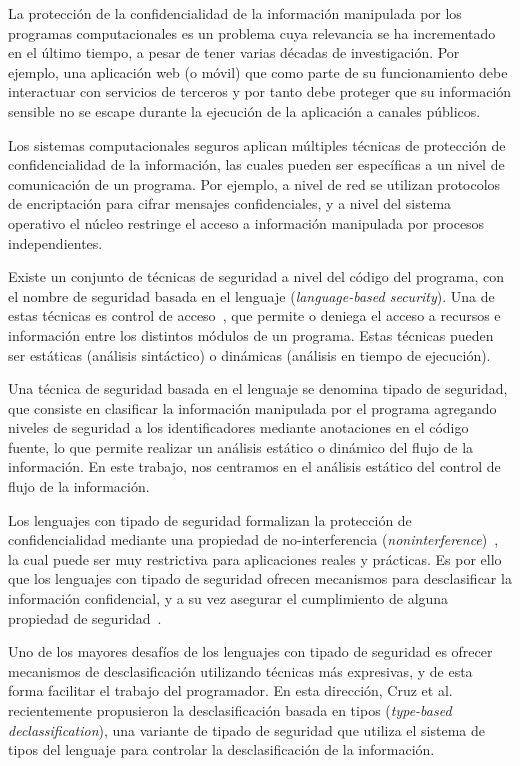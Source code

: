 \begin{intro}

	La protección de la confidencialidad de la información manipulada por los programas computacionales es un problema cuya relevancia se ha incrementado en el último tiempo, a pesar de tener varias décadas de investigación. Por ejemplo, una aplicación web (o móvil) que como parte de su funcionamiento debe interactuar con servicios de terceros y por tanto debe proteger que su información sensible no se escape durante la ejecución de la aplicación a canales públicos.

	Los sistemas computacionales seguros aplican múltiples técnicas de protección de confidencialidad de la información, las cuales pueden ser específicas a un nivel de comunicación de un programa. Por ejemplo, a nivel de red se utilizan protocolos de encriptación para cifrar mensajes confidenciales, y a nivel del sistema operativo el núcleo restringe el acceso a información manipulada por procesos independientes.

	Existe un conjunto de técnicas de seguridad a nivel del código del programa, con el nombre de seguridad basada en el lenguaje (\emph{language-based security}). Una de estas técnicas es control de acceso~\cite{controlacceso}, que permite o deniega el acceso a recursos e información entre los distintos módulos de un programa. Estas técnicas pueden ser estáticas (análisis sintáctico) o dinámicas (análisis en tiempo de ejecución).

	Una técnica de seguridad basada en el lenguaje se denomina tipado de seguridad, que consiste en clasificar la información manipulada por el programa agregando niveles de seguridad a los identificadores mediante anotaciones en el código fuente, lo que permite realizar un análisis estático o dinámico del flujo de la información. En este trabajo, nos centramos en el análisis estático del control de flujo de la información.

	Los lenguajes con tipado de seguridad formalizan la protección de confidencialidad mediante una propiedad de no-interferencia (\emph{noninterference})~\cite{noninterference}, la cual puede ser muy restrictiva para aplicaciones reales y prácticas. Es por ello que los lenguajes con tipado de seguridad ofrecen mecanismos para desclasificar la información confidencial, y a su vez asegurar el cumplimiento de alguna propiedad de seguridad~\cite{sabelfeldSands:JCS09}.

	Uno de los mayores desafíos de los lenguajes con tipado de seguridad es ofrecer mecanismos de desclasificación utilizando técnicas más expresivas, y de esta forma facilitar el trabajo del programador. En esta dirección, Cruz et al.~\cite{cruzAl:ecoop2017} recientemente propusieron la desclasificación basada en tipos (\emph{type-based declassification}), una variante de tipado de seguridad que utiliza el sistema de tipos del lenguaje para controlar la desclasificación de la información.


\end{intro}
